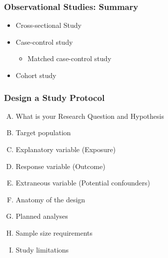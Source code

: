 \documentclass[table,10pt]{beamer}
\begin{document}
\begin{CJK*}{UTF8}{gbsn}
\begin{frame}[t]
\frametitle{Observational Studies: Summary}
\begin{itemize}
	\item<1-> Cross-sectional Study
	\item<2-> Case-control study
	\begin{itemize}
		\item<2-> Matched case-control study
	\end{itemize}
	\item<3-> Cohort study
\end{itemize}
\end{frame}


\begin{frame}[t]
\frametitle{Design a Study Protocol}
\begin{enumerate}[(A)]
	\item What is your Research Question and Hypothesis 
	\item Target population
	\item Explanatory variable (Exposure)
	\item Response variable (Outcome)
	\item Extraneous variable (Potential confounders)
	\item Anatomy of the design
	\item Planned analyses
	\item Sample size requirements
	\item Study limitations
\end{enumerate}
\end{frame}



\end{CJK*}
\end{document}
